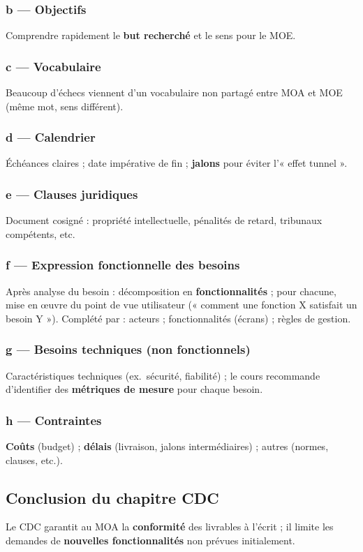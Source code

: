\documentclass[11pt,a4paper]{article}
\begin{document}
\subsubsection{b — Objectifs}
Comprendre rapidement le \textbf{but recherché} et le sens pour le MOE.

\subsubsection{c — Vocabulaire}
Beaucoup d'échecs viennent d'un vocabulaire non partagé entre MOA et MOE (même mot, sens différent).

\subsubsection{d — Calendrier}
Échéances claires ; date impérative de fin ; \textbf{jalons} pour éviter l'« effet tunnel ».

\subsubsection{e — Clauses juridiques}
Document cosigné : propriété intellectuelle, pénalités de retard, tribunaux compétents, etc.

\subsubsection{f — Expression fonctionnelle des besoins}
Après analyse du besoin : décomposition en \textbf{fonctionnalités} ; pour chacune, mise en \oe uvre du point de vue utilisateur (« comment une fonction X satisfait un besoin Y »). Complété par : acteurs ; fonctionnalités (écrans) ; règles de gestion.

\subsubsection{g — Besoins techniques (non fonctionnels)}
Caractéristiques techniques (ex.\ sécurité, fiabilité) ; le cours recommande d'identifier des \textbf{métriques de mesure} pour chaque besoin.

\subsubsection{h — Contraintes}
\textbf{Coûts} (budget) ; \textbf{délais} (livraison, jalons intermédiaires) ; autres (normes, clauses, etc.).

\subsection{Conclusion du chapitre CDC}
Le CDC garantit au MOA la \textbf{conformité} des livrables à l'écrit ; il limite les demandes de \textbf{nouvelles fonctionnalités} non prévues initialement.
\end{document}
